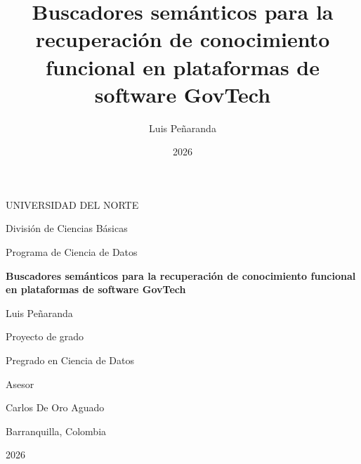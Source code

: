 \documentclass[11pt,letterpaper]{article}
\title{Buscadores semánticos para la recuperación de conocimiento funcional en plataformas de software GovTech}
\author{Luis Peñaranda}
\date{2026}
\numberwithin{equation}{section}
\begin{document}
\begin{titlepage}
\centering
{\large UNIVERSIDAD DEL NORTE\par}
\vspace{2pt}
{\normalsize División de Ciencias Básicas\par}
{\normalsize Programa de Ciencia de Datos\par}
\vspace{4.5cm}
{\LARGE\bfseries Buscadores semánticos para la recuperación de conocimiento funcional en plataformas de software GovTech\par}
\vspace{2.5cm}
{\large Luis Peñaranda\par}
\vspace{1.5cm}
{\normalsize Proyecto de grado\par}
{\normalsize Pregrado en Ciencia de Datos\par}
\vspace{1.5cm}
{\normalsize Asesor\par}
{\large Carlos De Oro Aguado\par}
\vfill
{\normalsize Barranquilla, Colombia\par}
{\normalsize 2026\par}
\end{titlepage}
\end{document}

